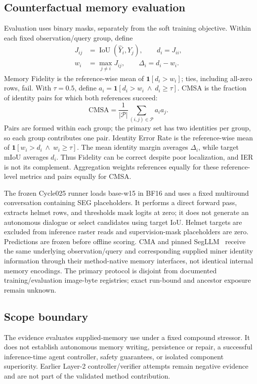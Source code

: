 \subsection{Counterfactual memory evaluation}
Evaluation uses binary masks, separately from the soft training objective.
Within each fixed observation/query group, define
\begin{align}
 J_{ij}&=\operatorname{IoU}(\hat Y_i,Y_j),\qquad d_i=J_{ii},\\
 w_i&=\max_{j\ne i}J_{ij},\qquad \Delta_i=d_i-w_i.
\end{align}
Memory Fidelity is the reference-wise mean of $\mathbf{1}[d_i>w_i]$;
ties, including all-zero rows, fail. With $\tau=0.5$, define
$a_i=\mathbf{1}[d_i>w_i\ \land\ d_i\geq\tau]$.
CMSA is the fraction of identity pairs for which both references succeed:
\begin{equation}
 \mathrm{CMSA}=\frac{1}{|\mathcal P|}
 \sum_{(i,j)\in\mathcal P}a_i a_j.
\end{equation}
Pairs are formed within each group; the primary set has two identities per
group, so each group contributes one pair. Identity Error Rate is the
reference-wise mean of $\mathbf{1}[w_i>d_i\ \land\ w_i\geq\tau]$.
The mean identity margin averages $\Delta_i$, while target mIoU averages $d_i$.
Thus Fidelity can be correct despite poor localization, and IER is not its
complement. Aggregation weights references equally for these reference-level
metrics and pairs equally for CMSA.

The frozen Cycle025 runner loads base-w15 in BF16 and uses a fixed multiround
conversation containing SEG placeholders. It performs a direct forward pass,
extracts helmet rows, and thresholds mask logits at zero; it does not generate
an autonomous dialogue or select candidates using target IoU. Helmet targets
are excluded from inference raster reads and supervision-mask placeholders
are zero. Predictions are frozen before offline scoring. CMA and pinned
SegLLM~\cite{wang2025segllm} receive the same underlying observation/query and corresponding supplied
miner identity information through their method-native memory interfaces,
not identical internal memory encodings. The primary protocol is disjoint
from documented training/evaluation image-byte registries; exact run-bound
and ancestor exposure remain unknown.

\subsection{Scope boundary}
The evidence evaluates supplied-memory use under a fixed compound stressor.
It does not establish autonomous memory writing, persistence or repair, a
successful inference-time agent controller, safety guarantees, or isolated
component superiority. Earlier Layer-2 controller/verifier attempts remain
negative evidence and are not part of the validated method contribution.
